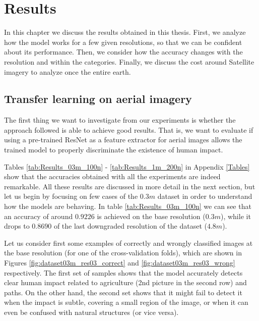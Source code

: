 
\chapter{Results} 

\label{Chapter5}


In this chapter we discuss the results obtained in this thesis. First, we analyze how the model works for a few given resolutions, so that we can be confident about its performance. Then, we consider how the accuracy changes with the resolution and within the categories. Finally, we discuss the cost around Satellite imagery to analyze once the entire earth. 

\section{Transfer learning on aerial imagery}

The first thing we want to investigate from our experiments is whether the approach followed is able to achieve good results. That is, we want to evaluate if using a pre-trained ResNet as a feature extractor for aerial images allows the trained model to properly discriminate the existence of human impact. 

Tables \ref{tab:Results_03m_100n} - \ref{tab:Results_1m_200n} in Appendix \ref{Tables} show that the accuracies obtained with all the experiments are indeed remarkable. All these results are discussed in more detail in the next section, but let us begin by focusing on few cases of the $0.3m$ dataset in order to understand how the models are behaving. In table \ref{tab:Results_03m_100n} we can see that an accuracy of around $0.9226$ is achieved on the base resolution ($0.3m$), while it drops to $0.8690$ of the last downgraded resolution of the dataset ($4.8m$).

Let us consider first some examples of correctly and wrongly classified images at the base resolution (for one of the cross-validation folds), which are shown in Figures \ref{fig:dataset03m_res03_correct} and \ref{fig:dataset03m_res03_wrong} respectively. The first set of samples shows that the model accurately detects clear human impact related to agriculture (2nd picture in the second row) and paths. On the other hand, the second set shows that it might fail to detect it when the impact is subtle, covering a small region of the image, or when it can even be confused with natural structures (or vice versa).


